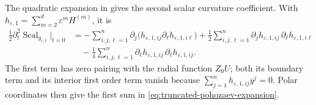 \documentclass[11pt]{article}
\numberwithin{equation}{section}
\theoremstyle{remark}
\begin{document}
The quadratic expansion in \cite[Lemma  A.2]{KMS} gives the second scalar
curvature coefficient. With
\(h_{\varepsilon,1}=\sum_{m=2}^d\varepsilon^mH^{(m)}\), it is
{
\begin{equation*}
\begin{aligned}
 \frac12\partial_t^2\operatorname{Scal}_{g_{\varepsilon,t}}\big|_{t=0}
 &=-\sum_{i,j,\ell=1}^n\partial_j
 \bigl(h_{\varepsilon,1,ij}\partial_\ell
 h_{\varepsilon,1,i\ell}\bigr)
 +\frac12\sum_{i,j,\ell=1}^n
 \partial_jh_{\varepsilon,1,ij}\,
 \partial_\ell h_{\varepsilon,1,i\ell}\\
 &\quad-\frac14\sum_{i,j,\ell=1}^n
 \partial_\ell h_{\varepsilon,1,ij}\,
 \partial_\ell h_{\varepsilon,1,ij}.
\end{aligned}
\end{equation*}
}
The first term has zero pairing with the radial function $Z_0U$;
both its boundary term and its interior first order term vanish because
$\sum_{j=1}^nh_{\varepsilon,1,ij}y^j=0$.  Polar coordinates then give
the first sum in \eqref{eq:truncated-pohozaev-expansion}.
\end{document}
